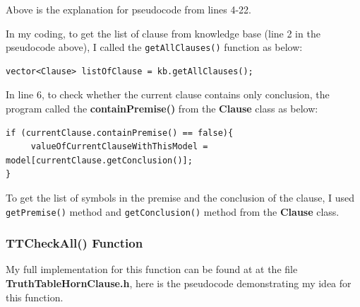 \documentclass{assignment}
\begin{document}
Above is the explanation for pseudocode from lines 4-22.

In my coding, to get the list of clause from knowledge base (line 2 in the pseudocode above), I called the \texttt{getAllClauses()} function as below:

\lstset{language=C++}
\begin{lstlisting}[caption={Getting the list of clauses from Knowledge Base}]
vector<Clause> listOfClause = kb.getAllClauses();
\end{lstlisting}

In line 6, to check whether the current clause contains only conclusion, the program called the \textbf{containPremise()} from the \textbf{Clause} class as below:

\lstset{language=C++}
\begin{lstlisting}[caption={Coding for lines 6-7}]
if (currentClause.containPremise() == false){
     valueOfCurrentClauseWithThisModel = model[currentClause.getConclusion()];
}
\end{lstlisting}

To get the list of symbols in the premise and the conclusion of the clause, I used \texttt{getPremise()} method and \texttt{getConclusion()} method from the \textbf{Clause} class.

\subsubsection{TTCheckAll() Function}

My full implementation for this function can be found at at the file \textbf{TruthTableHornClause.h}, here is the pseudocode demonstrating my idea for this function.
                                                                                                                                                                                                                                                                                                                                                                                                                                                                                                                                                                                                                                                
\end{document}
